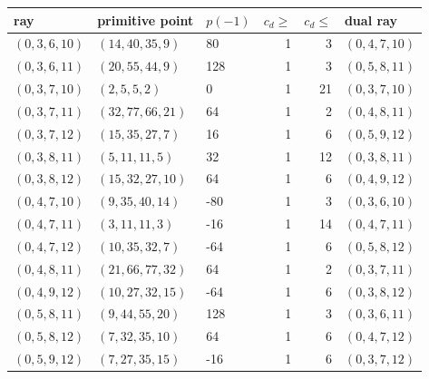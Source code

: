 \begin{tabular}{@{}lllrrl@{}}
\toprule
ray & primitive point & $p(-1)$ & $c_d \ge$ & $c_d \le$ & dual ray\\
\midrule
$(0,3,6,10)$ & $(14,40,35,9)$ & 80 & 1 & 3 & $(0,4,7,10)$\\
$(0,3,6,11)$ & $(20,55,44,9)$ & 128 & 1 & 3 & $(0,5,8,11)$\\
$(0,3,7,10)$ & $(2,5,5,2)$ & 0 & 1 & 21 & $(0,3,7,10)$\\
$(0,3,7,11)$ & $(32,77,66,21)$ & 64 & 1 & 2 & $(0,4,8,11)$\\
$(0,3,7,12)$ & $(15,35,27,7)$ & 16 & 1 & 6 & $(0,5,9,12)$\\
$(0,3,8,11)$ & $(5,11,11,5)$ & 32 & 1 & 12 & $(0,3,8,11)$\\
$(0,3,8,12)$ & $(15,32,27,10)$ & 64 & 1 & 6 & $(0,4,9,12)$\\
$(0,4,7,10)$ & $(9,35,40,14)$ & -80 & 1 & 3 & $(0,3,6,10)$\\
$(0,4,7,11)$ & $(3,11,11,3)$ & -16 & 1 & 14 & $(0,4,7,11)$\\
$(0,4,7,12)$ & $(10,35,32,7)$ & -64 & 1 & 6 & $(0,5,8,12)$\\
$(0,4,8,11)$ & $(21,66,77,32)$ & 64 & 1 & 2 & $(0,3,7,11)$\\
$(0,4,9,12)$ & $(10,27,32,15)$ & -64 & 1 & 6 & $(0,3,8,12)$\\
$(0,5,8,11)$ & $(9,44,55,20)$ & 128 & 1 & 3 & $(0,3,6,11)$\\
$(0,5,8,12)$ & $(7,32,35,10)$ & 64 & 1 & 6 & $(0,4,7,12)$\\
$(0,5,9,12)$ & $(7,27,35,15)$ & -16 & 1 & 6 & $(0,3,7,12)$\\
\bottomrule
\end{tabular}
